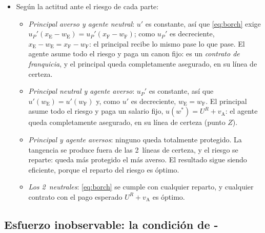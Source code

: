 \documentclass[11pt]{article}
\begin{document}
\begin{itemize}
\item Según la actitud ante el riesgo de cada parte:
  \begin{itemize}
  \item \emph{Principal averso y agente neutral}: $u'$ es constante, así que \eqref{eq:borch} exige $u_P'(x_{\mathrm{E}}-w_{\mathrm{E}})=u_P'(x_{\mathrm{F}}-w_{\mathrm{F}})$; como $u_P'$ es decreciente, $x_{\mathrm{E}}-w_{\mathrm{E}}=x_{\mathrm{F}}-w_{\mathrm{F}}$: el principal recibe lo mismo pase lo que pase. El agente asume todo el riesgo y paga un canon fijo: es un \emph{contrato de franquicia}, y el principal queda completamente asegurado, en su línea de certeza.
  \item \emph{Principal neutral y agente averso}: $u_P'$ es constante, así que $u'(w_{\mathrm{E}})=u'(w_{\mathrm{F}})$ y, como $u'$ es decreciente, $w_{\mathrm{E}}=w_{\mathrm{F}}$. El principal asume todo el riesgo y paga un salario fijo, $u(w^*)=U^R+v_{\mathrm{A}}$: el agente queda completamente asegurado, en su línea de certeza (punto $Z$).
  \item \emph{Principal y agente aversos}: ninguno queda totalmente protegido. La tangencia se produce fuera de las 2~líneas de certeza, y el riesgo se reparte: queda más protegido el más averso. El resultado sigue siendo eficiente, porque el reparto del riesgo es óptimo.
  \item \emph{Los 2~neutrales}: \eqref{eq:borch} se cumple con cualquier reparto, y cualquier contrato con el pago esperado $U^R+v_{\mathrm{A}}$ es óptimo.
  \end{itemize}
\end{itemize}
\findemo

\subsection{Esfuerzo inobservable: la condición de -}\label{anexo:pa-inobservable}
\end{document}

